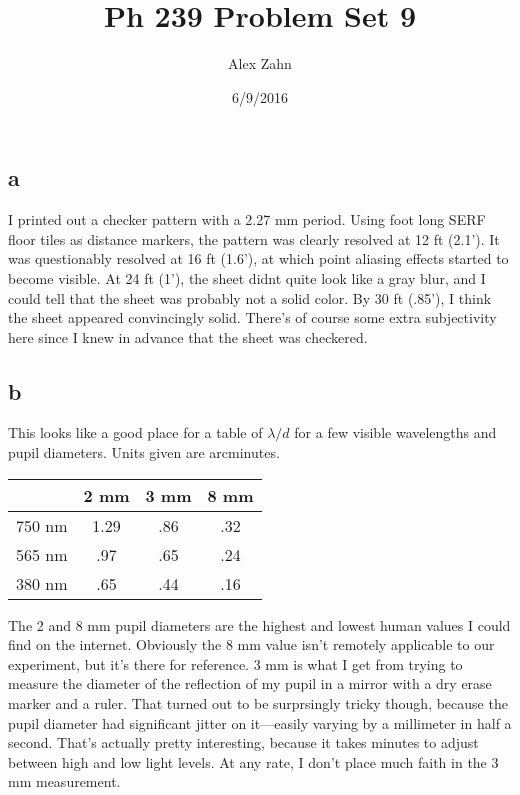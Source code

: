 \documentclass[12pt]{article}
\title{Ph 239 Problem Set 9}
\author{Alex Zahn}
\date{6/9/2016}
\begin{document}
\maketitle

\newcommand{\wmsq}{W/\(\mathrm{m}^2\,\)}
\newcommand{\msq}{\(\mathrm{m}^2\,\)}
\newcommand{\micron}{\(\mu\mathrm{m}\)\,}
\newcommand{\mcb}{\(\mathrm{m}^3\,\)}
\newcommand{\degree}{\(^\circ\,\)}


\section{}

\subsection{a}

I printed out a checker pattern with a 2.27 mm period. Using foot long SERF floor tiles as distance markers, the pattern was clearly resolved at 12 ft (2.1'). It was questionably resolved at 16 ft (1.6'), at which point aliasing effects started to become visible. At 24 ft (1'), the sheet didnt quite look like a gray blur, and I could tell that the sheet was probably not a solid color. By 30 ft (.85'), I think the sheet appeared convincingly solid. There's of course some extra subjectivity here since I knew in advance that the sheet was checkered.

\subsection{b}

This looks like a good place for a table of \(\lambda/d\) for a few visible wavelengths and pupil diameters. Units given are arcminutes.

\begin{center}
\begin{tabular}{|c|c|c|c|}
\hline
 & 2 mm& 3 mm & 8 mm \\ \hline 
750 nm &1.29 &.86 &.32\\ \hline
565 nm &.97 &.65 &.24 \\ \hline
380 nm &.65 &.44 &.16 \\ \hline
\end{tabular}
\end{center}


The 2 and 8 mm pupil diameters are the highest and lowest human values I could find on the internet. Obviously the 8 mm value isn't remotely applicable to our experiment, but it's there for reference. 3 mm is what I get from trying to measure the diameter of the reflection of my pupil in a mirror with a dry erase marker and a ruler. That turned out to be surprsingly tricky though, because the pupil diameter had significant jitter on it---easily varying by a millimeter in half a second. That's actually pretty interesting, because it takes minutes to adjust between high and low light levels. At any rate, I don't place much faith in the 3 mm measurement.
\end{document}
